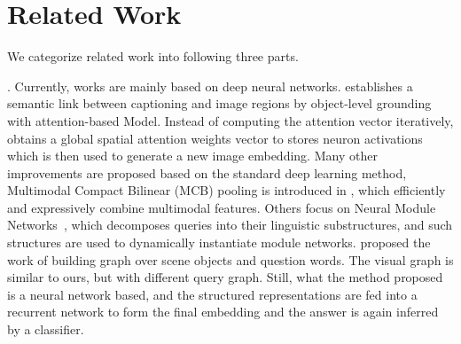 \section{Related Work}
\label{sec-related-work}
\hspace{-2ex}

\vspace{-3ex}
We categorize related work into following three parts. %


. Currently, \vqa works are mainly based on deep neural networks. \cite{zhu2016visual7w} establishes a semantic link between captioning and image regions by object-level
grounding with attention-based Model. Instead of computing the attention vector iteratively, \cite{xu2016ask} obtains a global spatial attention weights vector to stores neuron activations which is then used to generate a new image embedding. 
Many other improvements are proposed based on the standard deep learning method, \eg Multimodal Compact Bilinear (MCB) pooling is introduced in \cite{fukui2016multimodal}, which efficiently and expressively combine multimodal features. Others focus on Neural Module Networks~\cite{Andreas_2016,hu2017learning}, which decomposes queries into their linguistic substructures, and such structures are used to dynamically instantiate module networks. \cite{teney2017graph} proposed the work of building graph over scene objects and question words. The visual graph is similar to ours, but with different query graph. Still, what the method \cite{teney2017graph} proposed is a neural network based, and the structured representations are fed into a recurrent network to form the final embedding and the answer is again inferred by a classifier. 
